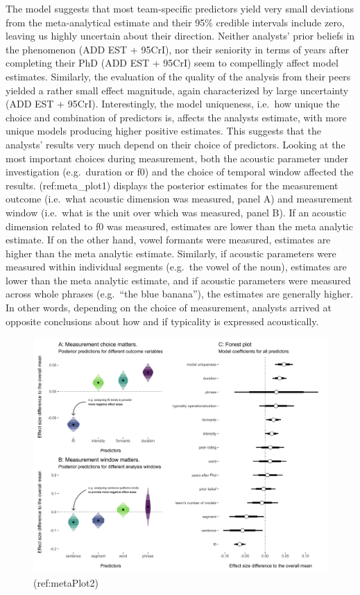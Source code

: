 \documentclass[Review,times,sageh]{sagej}
\begin{document}
The model suggests that most team-specific predictors yield very small deviations from the meta-analytical estimate and their 95\% credible intervals include zero, leaving us highly uncertain about their direction.
Neither analysts' prior beliefs in the phenomenon (ADD EST + 95CrI), nor their seniority in terms of years after completing their PhD (ADD EST + 95CrI) seem to compellingly affect model estimates.
Similarly, the evaluation of the quality of the analysis from their peers yielded a rather small effect magnitude, again characterized by large uncertainty (ADD EST + 95CrI).
Interestingly, the model uniqueness, i.e.~how unique the choice and combination of predictors is, affects the analysts estimate, with more unique models producing higher positive estimates.
This suggests that the analysts' results very much depend on their choice of predictors.
Looking at the most important choices during measurement, both the acoustic parameter under investigation (e.g.~duration or f0) and the choice of temporal window affected the results.
(ref:meta\_plot1) displays the posterior estimates for the measurement outcome (i.e.~what acoustic dimension was measured, panel A) and measurement window (i.e.~what is the unit over which was measured, panel B).
If an acoustic dimension related to f0 was measured, estimates are lower than the meta analytic estimate.
If on the other hand, vowel formants were measured, estimates are higher than the meta analytic estimate.
Similarly, if acoustic parameters were measured within individual segments (e.g.~the vowel of the noun), estimates are lower than the meta analytic estimate, and if acoustic parameters were measured across whole phrases (e.g.~``the blue banana''), the estimates are generally higher.
In other words, depending on the choice of measurement, analysts arrived at opposite conclusions about how and if typicality is expressed acoustically.

\begin{figure}
\includegraphics[width=1\linewidth]{../figs/alltogether} \caption{(ref:metaPlot2)}\label{fig:plot-meta2}
\end{figure}
\end{document}
